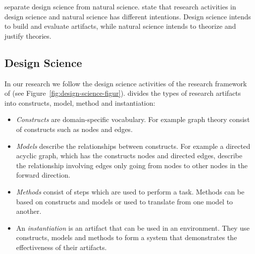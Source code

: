 \citet{simon1996sciences} separate design science from natural science.
\citet{march1995design} state that research activities in design science and natural science has different intentions. Design science intends to build and evaluate artifacts, while natural science intends to theorize and justify theories.

\subsection{Design Science}



In our research we follow the design science activities of the research framework of \citet{march1995design} (see Figure~\ref{fig:design-science-figur}).
\citet{march1995design} divides the types of research artifacts into constructs, model, method and instantiation:
\begin{itemize}
\item \emph{Constructs} are domain-specific vocabulary. For example graph theory consist of constructs such as nodes and edges.
\item \emph{Models} describe the relationships between constructs. For example a directed acyclic graph, which has the constructs nodes and directed edges, describe the relationship involving edges only going from nodes to other nodes in the forward direction.
\item \emph{Methods} consist of steps which are used to perform a task. Methods can be based on constructs and models or used to translate from one model to another.
\item An \emph{instantiation} is an artifact that can be used in an environment. They use constructs, models and methods to form a system that demonstrates the effectiveness of their artifacts.
\end{itemize}

